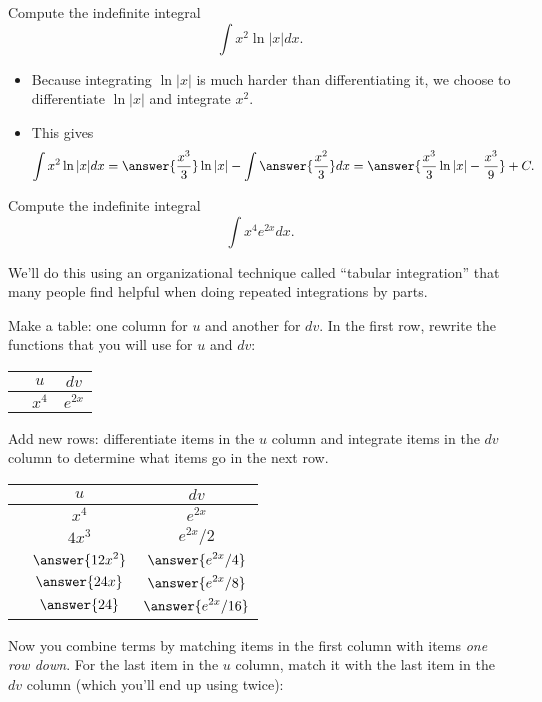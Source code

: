 \documentclass{ximera}
\begin{document}
\begin{example}
Compute the indefinite integral
\[ \int x^2 \ln |x| dx. \]
\begin{itemize}
\item Because integrating $\ln |x|$ is much harder than differentiating it, we choose to differentiate $\ln |x|$ and integrate $x^2$. 
\item This gives
\[ \int x^2 \ln |x| dx = \answer{\frac{x^3}{3}} \ln |x| - \int \answer{\frac{x^2}{3}} dx = \answer{ \frac{x^3}{3} \ln |x| - \frac{x^3}{9}} + C. \]
\end{itemize}
\end{example}


\begin{example}
Compute the indefinite integral
\[ \int x^4 e^{2x} dx. \]
\begin{itemize}
\item We'll do this using an organizational technique called ``tabular integration'' that many people find helpful when doing repeated integrations by parts.
\item Make a table: one column for $u$ and another for $dv$. In the first row, rewrite the functions that you will use for $u$ and $dv$:
\begin{center}
\begin{tabular}{ccc}
 & $u$ & $dv$ \\
 \hline
& $\displaystyle x^4$ & $\displaystyle e^{2x}$ 
\end{tabular}
\end{center}
\item Add new rows: differentiate items in the $u$ column and integrate items in the $dv$ column to determine what items go in the next row. 
\begin{center}
\begin{tabular}{ccc}
 & $u$ & $dv$ \\
 \hline
& $\displaystyle x^4$ & $\displaystyle e^{2x}$ \\
& $\displaystyle 4 x^3$ & $\displaystyle e^{2x}/2$ \\
& $\displaystyle \answer{12 x^2}$ & $\displaystyle \answer{e^{2x}/4}$ \\
& $\displaystyle \answer{24 x}$ & $\displaystyle \answer{e^{2x}/8}$ \\
& $\displaystyle \answer{24}$ & $\displaystyle  \answer{e^{2x}/16}$ \\
\end{tabular}
\item Now you combine terms by matching items in the first column with items \textit{one row down}. For the last item in the $u$ column, match it with the last item in the $dv$ column (which you'll end up using twice):

\end{center}
\end{itemize}
\end{example}
\end{document}
